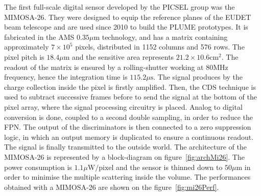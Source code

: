     The first full-scale digital sensor developed by the PICSEL group was the \gls{MIMOSA}-26.
    They were designed to equip the reference planes of the EUDET beam telescope and are used since 2010 to build the PLUME prototypes.
    It is fabricated in the AMS $0.35\mu\text{m}$ technology, and has a matrix containing approximately $7 \times 10^5$ pixels, distributed in 1152 columns and 576 rows.
    The pixel pitch is $18.4\mu\text{m}$ and the sensitive area represents $21.2 \times 10.6 \text{cm}^2$.
    The readout of the matrix is ensured by a rolling-shutter working at 80MHz frequency, hence the integration time is $115.2\mu\text{s}$.
    The signal produces by the charge collection inside the pixel is firstly amplified.
    Then, the \gls{CDS} technique is used to subtract successive frames before to send the signal at the bottom of the pixel array, where the signal processing circuitry is placed.
    Analog to digital conversion is done, coupled to a second double sampling, in order to reduce the \gls{FPN}.
    The output of the discriminators is then connected to a zero suppression logic, in which an output memory is duplicated to ensure a continuous readout.
    The signal is finally transmitted to the outside world.
    The architecture of the \gls{MIMOSA}-26 is represented by a block-diagram on figure~\ref{fig:archMi26}.
    The power consumption is $1.1\mu\text{W/pixel}$ and the sensor is thinned down to $50\mu\text{m}$ in order to minimise the multiple scattering inside the volume.
    The performances obtained with a \gls{MIMOSA}-26 are shown on the figure~\ref{fig:mi26Perf}.

